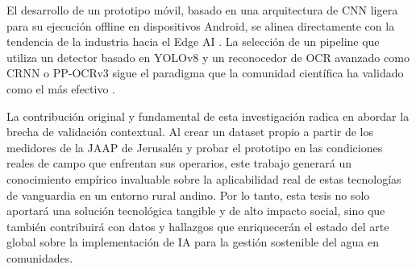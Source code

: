 El desarrollo de un prototipo móvil, basado en una arquitectura de CNN ligera para su ejecución offline en dispositivos Android, se alinea directamente con la tendencia de la industria hacia el Edge AI \parencite{Carvalho2023, Zou2021}. La selección de un pipeline que utiliza un detector basado en YOLOv8 y un reconocedor de OCR avanzado como CRNN o PP-OCRv3 sigue el paradigma que la comunidad científica ha validado como el más efectivo \parencite{Khan2024LowCost, Nguyen2025Water}.

La contribución original y fundamental de esta investigación radica en abordar la brecha de validación contextual. Al crear un dataset propio a partir de los medidores de la JAAP de Jerusalén y probar el prototipo en las condiciones reales de campo que enfrentan sus operarios, este trabajo generará un conocimiento empírico invaluable sobre la aplicabilidad real de estas tecnologías de vanguardia en un entorno rural andino. Por lo tanto, esta tesis no solo aportará una solución tecnológica tangible y de alto impacto social, sino que también contribuirá con datos y hallazgos que enriquecerán el estado del arte global sobre la implementación de IA para la gestión sostenible del agua en comunidades.